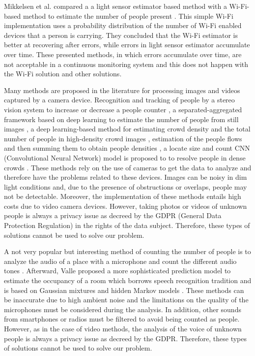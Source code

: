 Mikkelsen et al. compared a a light sensor estimator based method with a Wi-Fi-based method to estimate the number of people present \cite{mikkelsen2018sensing}. This simple Wi-Fi implementation uses a probability distribution of the number of Wi-Fi enabled devices that a person is carrying. They concluded that the Wi-Fi estimator is better at recovering after errors, while errors in light sensor estimator accumulate over time.
These presented methods, in which errors accumulate over time, are not acceptable in a continuous monitoring system and this does not happen with the Wi-Fi solution and other solutions.

Many methods are proposed in the literature for processing images and videos captured by a camera device. Recognition and tracking of people by a stereo vision system to increase or decrease a people counter \cite{bernini2014embedded}, a separated-aggregated framework based on deep learning to estimate the number of people from still images \cite{zhang2018auxiliary}, a deep learning-based method for estimating crowd density and the total number of people in high-density crowd images \cite{zhang2019deep}, estimation of the people flows and then summing them to obtain people densities \cite{liu2019estimating}, a locate size and count CNN (Convolutional Neural Network) model is proposed to to resolve people in dense crowds  \cite{sam2019locate}.
These methods rely on the use of cameras to get the data to analyze and therefore have the problems related to these devices. Images can be noisy in dim light conditions and, due to the presence of obstructions or overlaps, people may not be detectable. Moreover, the implementation of these methods entails high costs due to video camera devices. However, taking photos or videos of unknown people is always a privacy issue as decreed by the GDPR (General Data Protection Regulation) in the rights of the data subject. Therefore, these types of solutions cannot be used to solve our problem.

A not very popular but interesting method of counting the number of people is to analyze the audio of a place with a microphone and count the different audio tones \cite{kannan2012low}. Afterward, Valle proposed a more sophisticated prediction model to estimate the occupancy of a room which borrows speech recognition tradition and is based on Gaussian mixtures and hidden Markov models \cite{valle2016abroa}.
These methods can be inaccurate due to high ambient noise and the limitations on the quality of the microphones must be considered during the analysis. In addition, other sounds from smartphones or radios must be filtered to avoid being counted as people. However, as in the case of video methods, the analysis of the voice of unknown people is always a privacy issue as decreed by the GDPR. Therefore, these types of solutions cannot be used to solve our problem.

